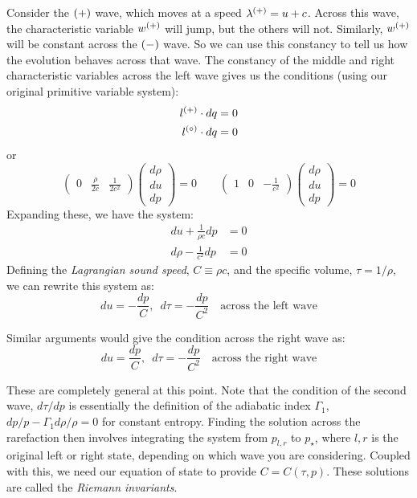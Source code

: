 Consider the ${(+)}$ wave, which moves at a speed $\lambda^{(+)} = u
+c$.  Across this wave, the characteristic variable $w^{(+)}$ will
jump, but the others will not.  Similarly, $w^{(+)}$ will be constant
across the ${(-)}$ wave.  So we can use this constancy to tell us how
the evolution behaves across that wave.  The constancy of the middle and right characteristic variables across the left
wave gives us the conditions (using our original primitive variable system):
\begin{align}
l^{(+)} \cdot dq &= 0 \\
l^{(\circ)} \cdot dq &= 0 
\end{align}
or 
\begin{equation}
\left ( \begin{array}{ccc} 0 & \frac{\rho}{2c} & \frac{1}{2c^2} \end{array} \right)
   \left ( \begin{array}{c} d\rho \\ du \\ dp \end{array} \right ) = 0
\qquad
%
\left ( \begin{array}{ccc} 1 & 0 & -\frac{1}{c^2} \end{array} \right)
   \left ( \begin{array}{c} d\rho \\ du \\ dp \end{array} \right ) = 0
\end{equation}
Expanding these, we have the system:
\begin{align}
du + \frac{1}{\rho c} dp &= 0 \\
d\rho - \frac{1}{c^2} dp &= 0 
\end{align}
Defining the {\em Lagrangian sound speed}, $C \equiv \rho c$, and the 
specific volume, $\tau = 1/\rho$, we can rewrite this system as:
\begin{equation}
du = -\frac{dp}{C} , \,\,\, d\tau = -\frac{dp}{C^2} \quad \mbox{across the left wave}
\end{equation}

Similar arguments would give the condition across the right wave as:
\begin{equation}
du = \frac{dp}{C} , \,\,\, d\tau = -\frac{dp}{C^2} \quad \mbox{across the right wave}
\end{equation}

These are completely general at this point.  Note that the condition
of the second wave, $d\tau/dp$ is essentially the definition of the
adiabatic index $\Gamma_1$, $dp/p - \Gamma_1 d\rho/\rho = 0$ for
constant entropy.  Finding the solution across the rarefaction then
involves integrating the system from $p_{l,r}$ to $p_\star$, where $l,
r$ is the original left or right state, depending on which wave you
are considering.  Coupled with this, we need our equation of state to
provide $C = C(\tau, p)$.  These solutions are called the {\em Riemann
  invariants}.

